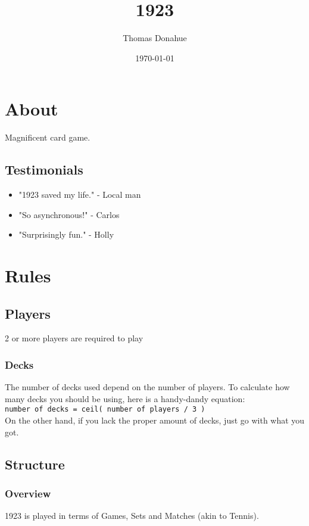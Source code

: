 \documentclass[11pt]{article}
\author{Thomas Donahue}
\date{\today}
\title{1923}
\begin{document}
\maketitle
\tableofcontents

\section{About}
\label{sec-1}
Magnificent card game.

\subsection{Testimonials}
\label{sec-1-1}
\begin{itemize}
\item "1923 saved my life." - Local man
\item "So asynchronous!" - Carlos
\item "Surprisingly fun." - Holly
\end{itemize}


\section{Rules}
\label{sec-2}
\subsection{Players}
\label{sec-2-1}
2 or more players are required to play

\subsubsection{Decks}
\label{sec-2-1-1}
The number of decks used depend on the number of players. To
calculate how many decks you should be using, here is a handy-dandy
equation:\\

\texttt{number of decks = ceil( number of players / 3 )}\\

On the other hand, if you lack the proper amount of decks, just go
with what you got. 

\subsection{Structure}
\label{sec-2-2}

\subsubsection{Overview}
\label{sec-2-2-1}
1923 is played in terms of Games, Sets and Matches (akin to Tennis).  
\end{document}
